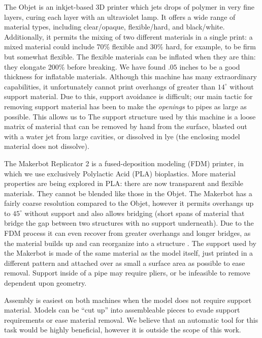 The Objet is an inkjet-based 3D printer which jets drops of polymer in very fine layers, curing each layer with an ultraviolet lamp.  It offers a wide range of material types, including clear/opaque, flexible/hard, and black/white.  Additionally, it permits the mixing of two different materials in a single print: a mixed material could include 70\% flexible and 30\% hard, for example, to be firm but somewhat flexible.  The flexible materials can be inflated when they are thin: they elongate 200\% before breaking.  We have found $.05$ inches to be a good thickness for inflatable materials.  Although this machine has many extraordinary capabilities, it unfortunately cannot print overhangs of greater than $14^{\circ}$ without support material.  Due to this, support avoidance is difficult; our main tactic for removing support material has been to make the \emph{openings} to pipes as large as possible.  This allows us to    The support structure used by this machine is a loose matrix of material that can be removed by hand from the surface, blasted out with a water jet from large cavities, or dissolved in lye (the enclosing model material does not dissolve).

The Makerbot Replicator 2 is a fused-deposition modeling (FDM) printer, in which we use exclusively Polylactic Acid (PLA) bioplastics.  More material properties are being explored in PLA: there are now transparent and flexible materials.  They cannot be blended like those in the Objet.  The Makerbot has a fairly coarse resolution compared to the Objet, however it permits overhangs up to $45^{\circ}$ without support and also allows bridging (short spans of material that bridge the gap between two structures with no support underneath).  Due to the FDM process it can even recover from greater overhangs and longer bridges, as the material builds up and can reorganize into a structure .  The support used by the Makerbot is made of the same material as the model itself, just printed in a different pattern and attached over as small a surface area as possible to ease removal.  Support inside of a pipe may require pliers, or be infeasible to remove dependent upon geometry.

Assembly is easiest on both machines when the model does not require support material.  Models can be ``cut up''  into assembleable pieces to evade support requirements or ease material removal.  We believe that an automatic tool for this task would be highly beneficial, however it is outside the scope of this work.